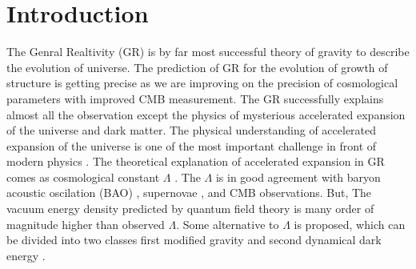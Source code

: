 \section{Introduction}
\label{sec:intro}

The Genral Realtivity (GR) is by far most successful theory of gravity to describe the evolution of universe\citep{Peebles1980,Davis83}. The prediction of GR for the evolution of growth of structure is getting precise as we are improving on the precision of cosmological parameters with improved CMB measurement. The GR successfully explains almost all the observation except the physics of mysterious accelerated expansion of the universe and dark matter. The physical understanding of accelerated expansion of the universe is one of the most important  challenge in front of modern physics \citep{Riess1998, Perlmutter1999}. The theoretical explanation of accelerated expansion in GR comes as cosmological constant $\Lambda$ \citep{Einstein1915}. The $\Lambda$ is in good agreement with baryon acoustic oscilation (BAO) \citep{Eis2005, Cole2005, Hutsi2006, Kazin2010, Percival2010, Reid2010, Eric2014, Anderson2014} , supernovae \citep{Suzuki2012, Conley2011}, and CMB \citep{Planck2013, Wmap2013} observations. But, The vacuum energy density predicted by quantum field theory \citep{Weinberg1989} is many order of magnitude higher than observed $\Lambda$.  Some alternative to $\Lambda$ is proposed, which can be divided into two classes first modified gravity \citep{Silvestri2009, Clifton2012} and second dynamical dark energy \citep{Copeland2006}. 

